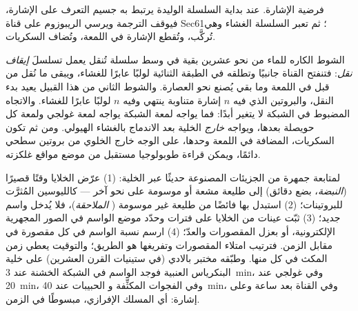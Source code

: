 \begin{omfigure}
{\small فرضية الإشارة.  عند بداية السلسلة
الوليدة يرتبط به جسيم التعرف على الإشارة، فيوقف
الترجمة ويرسي الريبوزوم على قناة Sec61؛ ثم تعبر السلسلة
الغشاء وهي تُركَّب، وتُقطع الإشارة في
اللمعة، وتُضاف السكريات.}
\end{omfigure}

\begin{proposition}\label{prop:b3:membrane-traffic:topology}
الشوط الكاره للماء من نحو عشرين بقية في وسط
سلسلة تُنقل يعمل تسلسلَ \emph{إيقاف نقل}: فتنفتح
القناة جانبيًا وتطلقه في الطبقة الثنائية لولبًا
عابرًا للغشاء، ويبقى ما نُقل من قبل في اللمعة
وما بقي يُصنع نحو العصارة. والشوط الثاني من هذا القبيل يعيد بدء
النقل، والبروتين الذي فيه $n$ إشارة متناوبة ينتهي وفيه
$n$ لولبًا عابرًا للغشاء. والاتجاه المضبوط في الشبكة
لا يتغير أبدًا: فما يواجه لمعة الشبكة يواجه لمعة
غولجي ولمعة كل حويصلة بعدها، ويواجه \emph{خارج}
الخلية بعد الاندماج بالغشاء الهيولي. ومن ثم تكون السكريات، المضافة في
اللمعة وحدها، على الوجه خارج الخلوي من بروتين سطحي دائمًا،
ويمكن قراءة طوبولوجيا مستقبل من موضع مواقع غلكزته.
\end{proposition}

\begin{method}\label{met:b3:membrane-traffic:pulse-chase}
لمتابعة جمهرة من الجزيئات المصنوعة حديثًا عبر الخلية: (1)
عرّض الخلايا وقتًا قصيرًا (\emph{النبضة}، بضع دقائق) إلى
طليعة مشعة أو موسومة على نحو آخر --- كالليوسين المُثرَّت
للبروتينات؛ (2) استبدل بها فائضًا من طليعة غير موسومة (
\emph{الملاحقة})، فلا يُدخل واسم جديد؛ (3) ثبّت عينات من
الخلايا على فترات وحدّد موضع الواسم  في الصور
المجهرية الإلكترونية، أو بعزل المقصورات والعدّ؛ (4) ارسم
نسبة الواسم في كل مقصورة في مقابل الزمن. فترتيب امتلاء
المقصورات وتفريغها هو الطريق؛ والتوقيت يعطي
زمن المكث في كل منها. وطبّقه مختبر بالادي (في ستينيات القرن العشرين) على
خلية البنكرياس العنبية فوجد الواسم في الشبكة الخشنة عند
\qty{3}{min}، وفي غولجي عند \qty{20}{min}، وفي الفجوات المكثِّفة و
الحبيبات عند \qty{40}{min}، وفي القناة بعد ساعة وعلى
إشارة: أي المسلك الإفرازي، مبسوطًا في الزمن.
\end{method}

